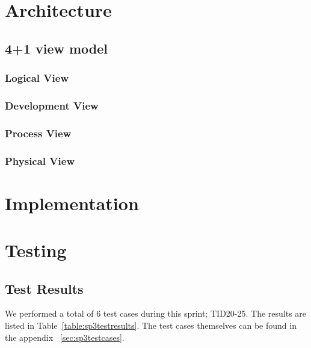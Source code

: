 \section{Architecture}
\subsection{4+1 view model}
\subsubsection{Logical View}
\subsubsection{Development View}
\subsubsection{Process View}
\subsubsection{Physical View}

\section{Implementation}

\section{Testing}
\subsection{Test Results}
We performed a total of 6 test cases during this sprint; TID20-25. The results are listed in Table~\ref{table:sp3testresults}. The test cases themselves can be found in the appendix ~\ref{sec:sp3testcases}.

